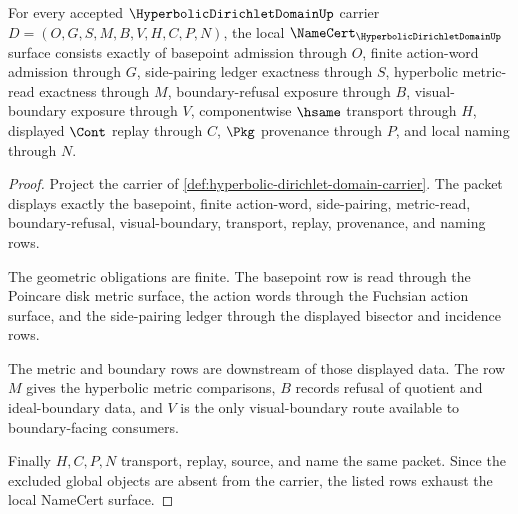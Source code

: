 \begin{theorem}
\label{thm:hyperbolic-dirichlet-domain-namecert-obligations}
For every accepted $\HyperbolicDirichletDomainUp$ carrier $D=(O,G,S,M,B,V,H,C,P,N)$, the local $\NameCert_{\HyperbolicDirichletDomainUp}$ surface consists exactly of basepoint admission through $O$, finite action-word admission through $G$, side-pairing ledger exactness through $S$, hyperbolic metric-read exactness through $M$, boundary-refusal exposure through $B$, visual-boundary exposure through $V$, componentwise $\hsame$ transport through $H$, displayed $\Cont$ replay through $C$, $\Pkg$ provenance through $P$, and local naming through $N$.
\end{theorem}
\begin{proof}
Project the carrier of \autoref{def:hyperbolic-dirichlet-domain-carrier}. The packet displays exactly the basepoint, finite action-word, side-pairing, metric-read, boundary-refusal, visual-boundary, transport, replay, provenance, and naming rows.

The geometric obligations are finite. The basepoint row is read through the Poincare disk metric surface, the action words through the Fuchsian action surface, and the side-pairing ledger through the displayed bisector and incidence rows.

The metric and boundary rows are downstream of those displayed data. The row $M$ gives the hyperbolic metric comparisons, $B$ records refusal of quotient and ideal-boundary data, and $V$ is the only visual-boundary route available to boundary-facing consumers.

Finally $H,C,P,N$ transport, replay, source, and name the same packet. Since the excluded global objects are absent from the carrier, the listed rows exhaust the local NameCert surface.
\end{proof}

